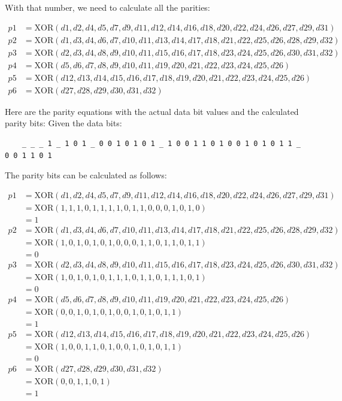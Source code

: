 \documentclass[a4paper,11pt]{article}%
\newenvironment{qanda}{\setlength{\parindent}{0pt}}{\bigskip}
\begin{document}
\begin{qanda}
	With that number, we need to calculate all the parities:
	
	\begin{align*}
p1 &= \text{XOR}(d1, d2, d4, d5, d7, d9, d11, d12, d14, d16, d18, d20, d22, d24, d26, d27, d29, d31) \\
p2 &= \text{XOR}(d1, d3, d4, d6, d7, d10, d11, d13, d14, d17, d18, d21, d22, d25, d26, d28, d29, d32) \\
p3 &= \text{XOR}(d2, d3, d4, d8, d9, d10, d11, d15, d16, d17, d18, d23, d24, d25, d26, d30, d31, d32) \\
p4 &= \text{XOR}(d5, d6, d7, d8, d9, d10, d11, d19, d20, d21, d22, d23, d24, d25, d26) \\
p5 &= \text{XOR}(d12, d13, d14, d15, d16, d17, d18, d19, d20, d21, d22, d23, d24, d25, d26) \\
p6 &= \text{XOR}(d27, d28, d29, d30, d31, d32)
	\end{align*}

	Here are the parity equations with the actual data bit values and the calculated parity bits:
	Given the data bits:

	\begin{verbatim}
	_ _ _ 1 _ 1 0 1 _ 0 0 1 0 1 0 1 _ 1 0 0 1 1 0 1 0 0 1 0 1 0 1 1 _ 0 0 1 1 0 1
	\end{verbatim}
	
	The parity bits can be calculated as follows:
	
	\begin{align*}
p1 &= \text{XOR}(d1, d2, d4, d5, d7, d9, d11, d12, d14, d16, d18, d20, d22, d24, d26, d27, d29, d31) \\
&= \text{XOR}(1, 1, 1, 0, 1, 1, 1, 1, 0, 1, 1, 0, 0, 0, 1, 0, 1, 0) \\
&= 1 \\
p2 &= \text{XOR}(d1, d3, d4, d6, d7, d10, d11, d13, d14, d17, d18, d21, d22, d25, d26, d28, d29, d32) \\
&= \text{XOR}(1, 0, 1, 0, 1, 0, 1, 0, 0, 0, 1, 1, 0, 1, 1, 0, 1, 1) \\
&= 0 \\
p3 &= \text{XOR}(d2, d3, d4, d8, d9, d10, d11, d15, d16, d17, d18, d23, d24, d25, d26, d30, d31, d32) \\
&= \text{XOR}(1, 0, 1, 0, 1, 0, 1, 1, 1, 0, 1, 1, 0, 1, 1, 1, 0, 1) \\
&= 0 \\
p4 &= \text{XOR}(d5, d6, d7, d8, d9, d10, d11, d19, d20, d21, d22, d23, d24, d25, d26) \\
&= \text{XOR}(0, 0, 1, 0, 1, 0, 1, 0, 0, 1, 0, 1, 0, 1, 1) \\
&= 1 \\
p5 &= \text{XOR}(d12, d13, d14, d15, d16, d17, d18, d19, d20, d21, d22, d23, d24, d25, d26) \\
&= \text{XOR}(1, 0, 0, 1, 1, 0, 1, 0, 0, 1, 0, 1, 0, 1, 1) \\
&= 0 \\
p6 &= \text{XOR}(d27, d28, d29, d30, d31, d32) \\
&= \text{XOR}(0, 0, 1, 1, 0, 1) \\
&= 1
	\end{align*}
	

\end{qanda}
\end{document}
